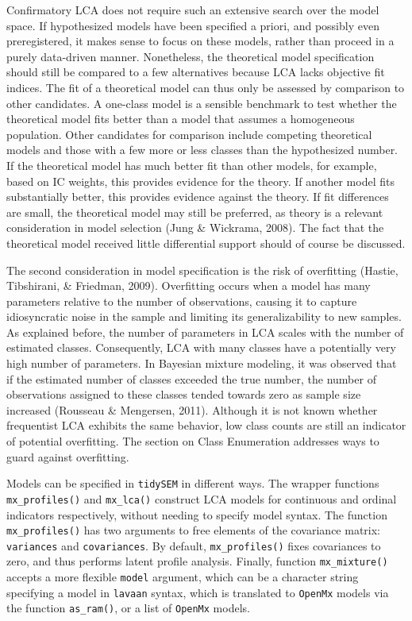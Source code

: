 \documentclass[
  ,man,floatsintext]{apa6}
\begin{document}
Confirmatory LCA does not require such an extensive search over the model space.
If hypothesized models have been specified a priori,
and possibly even preregistered,
it makes sense to focus on these models, rather than proceed in a purely data-driven manner.
Nonetheless, the theoretical model specification should still be compared to a few alternatives because LCA lacks objective fit indices.
The fit of a theoretical model can thus only be assessed by comparison to other candidates.
A one-class model is a sensible benchmark
to test whether the theoretical model fits better than a model that assumes a homogeneous population.
Other candidates for comparison include competing theoretical models and those with a few more or less classes than the hypothesized number.
If the theoretical model has much better fit than other models,
for example, based on IC weights,
this provides evidence for the theory.
If another model fits substantially better,
this provides evidence against the theory.
If fit differences are small, the theoretical model may still be preferred, as theory is a relevant consideration in model selection (Jung \& Wickrama, 2008).
The fact that the theoretical model received little differential support should of course be discussed.

The second consideration in model specification is the risk of overfitting (Hastie, Tibshirani, \& Friedman, 2009).
Overfitting occurs when a model has many parameters relative to the number of observations,
causing it to capture idiosyncratic noise in the sample and limiting its generalizability to new samples.
As explained before, the number of parameters in LCA scales with the number of estimated classes.
Consequently, LCA with many classes have a potentially very high number of parameters.
In Bayesian mixture modeling,
it was observed that if the estimated number of classes exceeded the true number, the number of observations assigned to these classes tended towards zero as sample size increased (Rousseau \& Mengersen, 2011).
Although it is not known whether frequentist LCA exhibits the same behavior,
low class counts are still an indicator of potential overfitting.
The section on Class Enumeration addresses ways to guard against overfitting.

Models can be specified in \texttt{tidySEM} in different ways.
The wrapper functions \texttt{mx\_profiles()} and \texttt{mx\_lca()} construct LCA models for continuous and ordinal indicators respectively, without needing to specify model syntax.
The function \texttt{mx\_profiles()} has two arguments to free elements of the covariance matrix: \texttt{variances} and \texttt{covariances}.
By default, \texttt{mx\_profiles()} fixes covariances to zero, and thus performs latent profile analysis.
Finally, function \texttt{mx\_mixture()} accepts a more flexible \texttt{model} argument, which can be a character string specifying a model in \texttt{lavaan} syntax,
which is translated to \texttt{OpenMx} models via the function \texttt{as\_ram()},
or a list of \texttt{OpenMx} models.
\end{document}
